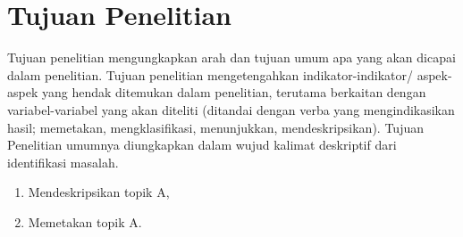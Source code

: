 \section{Tujuan Penelitian}
Tujuan penelitian mengungkapkan arah dan tujuan umum apa yang akan dicapai dalam penelitian. Tujuan penelitian mengetengahkan indikator-indikator/ aspek- aspek yang hendak ditemukan dalam penelitian, terutama berkaitan dengan variabel-variabel yang akan diteliti (ditandai dengan verba yang mengindikasikan hasil; memetakan, mengklasifikasi, menunjukkan, mendeskripsikan). Tujuan Penelitian umumnya diungkapkan dalam wujud kalimat deskriptif dari identifikasi masalah.
\begin{enumerate}
  \item Mendeskripsikan topik A,
  \item Memetakan topik A.
\end{enumerate}
